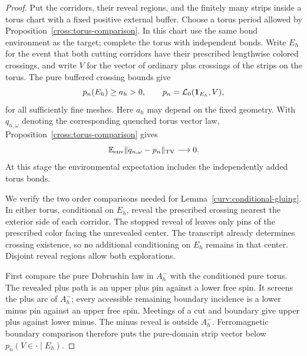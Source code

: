 \begin{proof}
Put the corridors, their reveal regions, and the finitely many strips
inside a torus chart with a fixed positive external buffer.  Choose a
torus period allowed by Proposition~\ref{cross:torus-comparison}.  In
this chart use the same bond environment as the target; complete the
torus with independent bonds.  Write $E_h$ for the event that both
cutting corridors have their prescribed lengthwise colored crossings,
and write $V$ for the vector of ordinary plus crossings of the strips
on the torus.  The pure buffered crossing bounds give
\[
 p_n(E_h)\ge a_h>0,
 \qquad
 p_n=\mathcal L_0(\mathbf 1_{E_h},V),
\]
for all sufficiently fine meshes.  Here $a_h$ may depend on the fixed
geometry.  With $q_{n,\omega}$ denoting the corresponding quenched
torus vector law, Proposition~\ref{cross:torus-comparison} gives
\begin{equation}
 \mathbb E_{\mathrm{env}}\|q_{n,\omega}-p_n\|_{\operatorname{TV}}\longrightarrow0.
 \label{curv:middle-tv}
\end{equation}
At this stage the environmental expectation includes the independently
added torus bonds.

We verify the two order comparisons needed for
Lemma~\ref{curv:conditional-gluing}.  In either torus, conditional on
$E_h$, reveal the prescribed crossing nearest the exterior side of each
corridor.  The stopped reveal of
\cite[Section~6, Lemma ``Reveals with a monochromatic facing boundary'';
Section~7, proof of
``Fixed-geometry boundary squeeze'']{S} leaves only pins of the
prescribed color facing the unrevealed center.  The transcript already
determines crossing existence, so no additional conditioning on $E_h$
remains in that center.  Disjoint reveal regions allow both explorations.

First compare the pure Dobrushin law in $A_h^-$ with the conditioned
pure torus.  The revealed plus path is an upper plus pin against a
lower free spin.  It screens the plus arc of $A_h^-$; every accessible
remaining boundary incidence is a lower minus pin against an upper free
spin.  Meetings of a cut and boundary give upper plus against lower
minus.  The minus reveal is outside $A_h^-$.  Ferromagnetic boundary
comparison therefore puts the pure-domain strip vector below
$p_n(V\in\cdot\mid E_h)$.


\end{proof}
